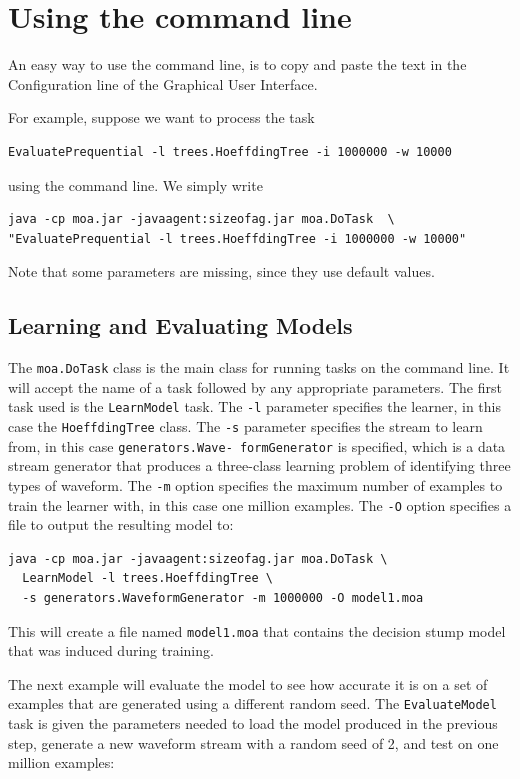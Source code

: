 \documentclass[a4paper,12pt]{article}
\begin{document}
\section{Using the command line}

An easy way to use the command line, is to copy and paste the text in the Configuration line of the Graphical User Interface.%

For example, suppose we want to process the task 
\begin{verbatim}EvaluatePrequential -l trees.HoeffdingTree -i 1000000 -w 10000\end{verbatim} 
using the command line. We simply write 
\begin{verbatim}
java -cp moa.jar -javaagent:sizeofag.jar moa.DoTask  \
"EvaluatePrequential -l trees.HoeffdingTree -i 1000000 -w 10000"
\end{verbatim}

Note that some parameters are missing, since they use default values.


\subsection{Learning and Evaluating Models}

The \verb+moa.DoTask+ class is the main class for running tasks on the command line. It will accept the name of a task followed by any appropriate parameters. The first task used is the \verb+LearnModel+ task. The \verb+-l+ parameter specifies the learner, in this case the \verb+HoeffdingTree+ class. The \verb+-s+ parameter specifies the stream to learn from, in this case {\tt generators.Wave- formGenerator} is specified, which is a data stream generator that produces a three-class learning problem of identifying three types of waveform. The \verb+-m+ option specifies the maximum number of examples to train the learner with, in this case one million examples. The \verb+-O+ option specifies a file to output the resulting model to:

\begin{verbatim}
java -cp moa.jar -javaagent:sizeofag.jar moa.DoTask \
  LearnModel -l trees.HoeffdingTree \
  -s generators.WaveformGenerator -m 1000000 -O model1.moa
\end{verbatim}

This will create a file named \verb+model1.moa+ that contains the decision stump model that was induced during training.

The next example will evaluate the model to see how accurate it is on a set of examples that are generated using a different random seed. The \verb+EvaluateModel+ task is given the parameters needed to load the model produced in the previous step, generate a new waveform stream with a random seed of 2, and test on one million examples:
\end{document}
